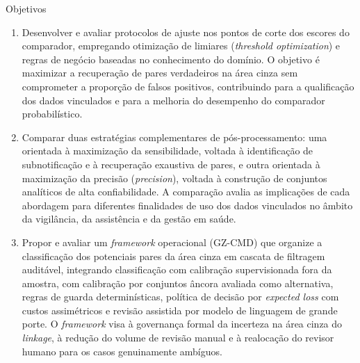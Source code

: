 \begin{chapter}{Objetivos}
\begin{enumerate}
\item Desenvolver e avaliar protocolos de ajuste nos pontos de corte dos escores do comparador, empregando otimização de limiares (\textit{threshold optimization}) e regras de negócio baseadas no conhecimento do domínio. O objetivo é maximizar a recuperação de pares verdadeiros na área cinza sem comprometer a proporção de falsos positivos, contribuindo para a qualificação dos dados vinculados e para a melhoria do desempenho do comparador probabilístico.

\item Comparar duas estratégias complementares de pós-processamento: uma orientada à maximização da sensibilidade, voltada à identificação de subnotificação e à recuperação exaustiva de pares, e outra orientada à maximização da precisão (\textit{precision}), voltada à construção de conjuntos analíticos de alta confiabilidade. A comparação avalia as implicações de cada abordagem para diferentes finalidades de uso dos dados vinculados no âmbito da vigilância, da assistência e da gestão em saúde.

\item Propor e avaliar um \textit{framework} operacional (GZ-CMD) que organize a classificação dos potenciais pares da área cinza em cascata de filtragem auditável, integrando classificação com calibração supervisionada fora da amostra, com calibração por conjuntos âncora avaliada como alternativa, regras de guarda determinísticas, política de decisão por \textit{expected loss} com custos assimétricos e revisão assistida por modelo de linguagem de grande porte. O \textit{framework} visa à governança formal da incerteza na área cinza do \textit{linkage}, à redução do volume de revisão manual e à realocação do revisor humano para os casos genuinamente ambíguos.

\end{enumerate}

\end{chapter}
